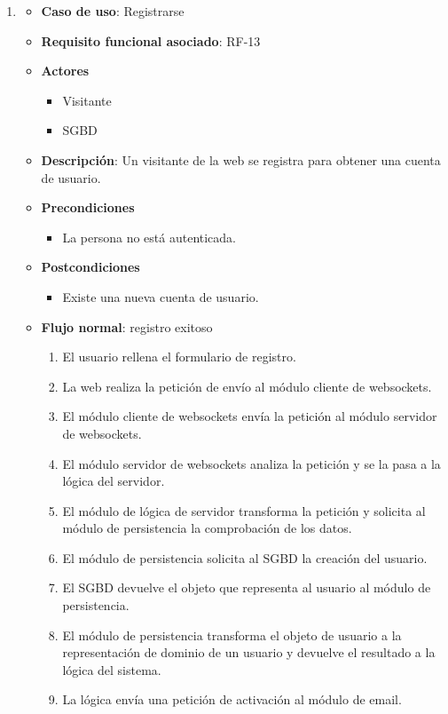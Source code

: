 \begin{enumerate}
\item %
  \begin{itemize}
  \item \textbf{Caso de uso}: Registrarse
  \item \textbf{Requisito funcional asociado}: RF-13
  \item \textbf{Actores}
    \begin{itemize}
    \item Visitante
    \item SGBD
    \end{itemize}
  \item \textbf{Descripción}: Un visitante de la web se registra para obtener una cuenta de usuario.
  \item \textbf{Precondiciones}
    \begin{itemize}
    \item La persona no está autenticada.
    \end{itemize}
  \item \textbf{Postcondiciones}
    \begin{itemize}
    \item Existe una nueva cuenta de usuario.
    \end{itemize}
  \item \textbf{Flujo normal}: registro exitoso
    \begin{enumerate}
    \item El usuario rellena el formulario de registro.
    \item La web realiza la petición de envío al módulo cliente de websockets.
    \item El módulo cliente de websockets envía la petición al módulo servidor de websockets.
    \item El módulo servidor de websockets analiza la petición y se la pasa a la lógica del servidor.
    \item El módulo de lógica de servidor transforma la petición y solicita al módulo de persistencia la comprobación de los datos.
    \item El módulo de persistencia solicita al SGBD la creación del usuario.
    \item El SGBD devuelve el objeto que representa al usuario al módulo de persistencia.
    \item El módulo de persistencia transforma el objeto de usuario a la representación de dominio de un usuario y devuelve el resultado a la lógica del sistema.
    \item La lógica envía una petición de activación al módulo de email.

\end{enumerate}
\end{itemize}
\end{enumerate}
